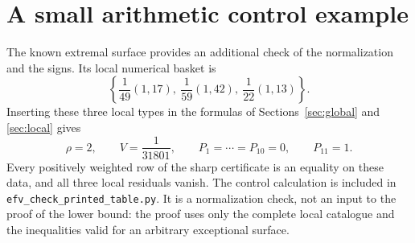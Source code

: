 \documentclass[12pt,a4paper]{article}
\numberwithin{equation}{section}
\theoremstyle{definition}
\begin{document}
\section{A small arithmetic control example}\label{app:control}

The known extremal surface provides an additional check of the
normalization and the signs.
Its local numerical basket is
\[
             \left\{\frac1{49}(1,17),\
                         \frac1{59}(1,42),\
                         \frac1{22}(1,13)\right\}.
\]
Inserting these three local types in the formulas of
Sections~\ref{sec:global} and \ref{sec:local} gives
\[
 \rho=2,\qquad V=\frac1{31801},\qquad
 P_1=\cdots=P_{10}=0,\qquad P_{11}=1.
\]
Every positively weighted row of the sharp certificate is an
equality on these data, and all three local residuals vanish.
The control calculation is included in
\texttt{efv\_check\_printed\_table.py}.
It is a normalization check, not an input to the proof of the
lower bound: the proof uses only the complete local catalogue and
the inequalities valid for an arbitrary exceptional surface.
\end{document}
